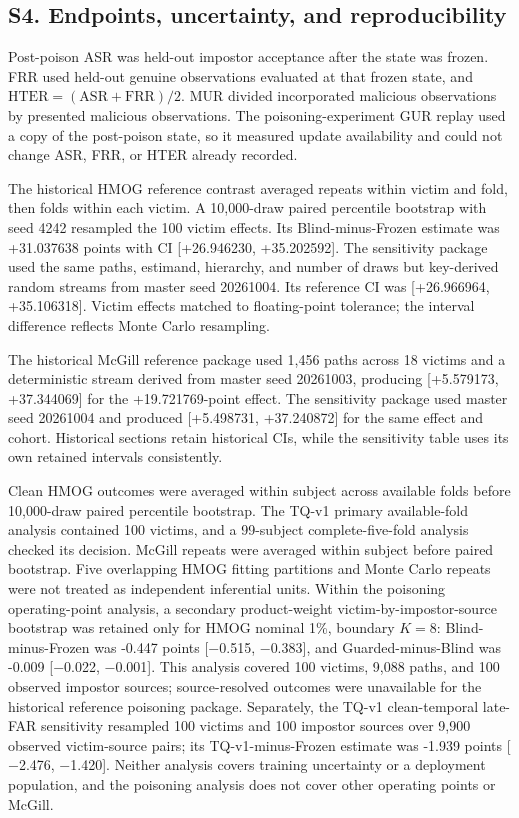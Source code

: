 \documentclass[technologies,supfile,submit,moreauthors]{Definitions/mdpi}
\begin{document}
\subsection*{S4. Endpoints, uncertainty, and reproducibility}\label{sm:s4}

Post-poison ASR was held-out impostor acceptance after the state was frozen. FRR used held-out genuine observations evaluated at that frozen state, and \(\mathrm{HTER}=(\mathrm{ASR}+\mathrm{FRR})/2\). MUR divided incorporated malicious observations by presented malicious observations. The poisoning-experiment GUR replay used a copy of the post-poison state, so it measured update availability and could not change ASR, FRR, or HTER already recorded.

The historical HMOG reference contrast averaged repeats within victim and fold, then folds within each victim. A 10,000-draw paired percentile bootstrap with seed 4242 resampled the 100 victim effects. Its Blind-minus-Frozen estimate was +31.037638 points with CI {[}+26.946230, +35.202592{]}. The sensitivity package used the same paths, estimand, hierarchy, and number of draws but key-derived random streams from master seed 20261004. Its reference CI was {[}+26.966964, +35.106318{]}. Victim effects matched to floating-point tolerance; the interval difference reflects Monte Carlo resampling.

The historical McGill reference package used 1,456 paths across 18 victims and a deterministic stream derived from master seed 20261003, producing {[}+5.579173, +37.344069{]} for the +19.721769-point effect. The sensitivity package used master seed 20261004 and produced {[}+5.498731, +37.240872{]} for the same effect and cohort. Historical sections retain historical CIs, while the sensitivity table uses its own retained intervals consistently.

Clean HMOG outcomes were averaged within subject across available folds before 10,000-draw paired percentile bootstrap. The TQ-v1 primary available-fold analysis contained 100 victims, and a 99-subject complete-five-fold analysis checked its decision. McGill repeats were averaged within subject before paired bootstrap. Five overlapping HMOG fitting partitions and Monte Carlo repeats were not treated as independent inferential units. Within the poisoning operating-point analysis, a secondary product-weight victim-by-impostor-source bootstrap was retained only for HMOG nominal 1\%, boundary \(K=8\): Blind-minus-Frozen was -0.447 points {[}\ensuremath{-}0.515, \ensuremath{-}0.383{]}, and Guarded-minus-Blind was -0.009 {[}\ensuremath{-}0.022, \ensuremath{-}0.001{]}. This analysis covered 100 victims, 9,088 paths, and 100 observed impostor sources; source-resolved outcomes were unavailable for the historical reference poisoning package. Separately, the TQ-v1 clean-temporal late-FAR sensitivity resampled 100 victims and 100 impostor sources over 9,900 observed victim-source pairs; its TQ-v1-minus-Frozen estimate was -1.939 points {[}\ensuremath{-}2.476, \ensuremath{-}1.420{]}. Neither analysis covers training uncertainty or a deployment population, and the poisoning analysis does not cover other operating points or McGill.
\end{document}
